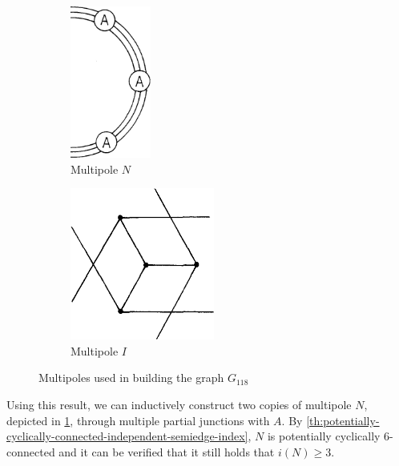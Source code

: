 \documentclass[12pt, twoside]{book}
\begin{document}
\begin{example}
	\begin{figure}
		\centering
		\begin{subfigure}[b]{0.45\textwidth}
			\centering
			\includegraphics[height=5cm, width=\textwidth, keepaspectratio]{images/Kochol-article/Kochol-building-multipole}
			\caption{Multipole $N$}
			\label{fig:Kochol-first-multipole}
		\end{subfigure}
		\hfill
		\begin{subfigure}[b]{0.45\textwidth}
			\centering
			\includegraphics[height=5cm, width=\textwidth, keepaspectratio]{images/Kochol-article/Kochol-inner-multipole}
			\caption{Multipole $I$}
			\label{fig:Kochol-inner-multipole}
		\end{subfigure}
		\caption{Multipoles used in building the graph $G_{118}$}
	\end{figure}
	
	Using this result, we can inductively construct two copies of multipole $N$, depicted in \cref{fig:Kochol-first-multipole}, through multiple partial junctions with $A$. By \cref{th:potentially-cyclically-connected-independent-semiedge-index}, $N$ is potentially cyclically 6-connected and it can be verified that it still holds that $i(N)\geq 3$.
	

\end{example}
\end{document}

